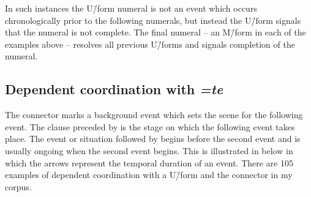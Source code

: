 \begin{exe}
	\label{ex:83}
	\label{ex:130823-5, 0.42}
\end{exe}

In such instances the U\=/form numeral is not an event which
occurs chronologically prior to the following numerals,
but instead the U\=/form signals that the numeral is not complete.
The final numeral -- an M\=/form in each of the examples above --
resolves all previous U\=/forms and signals completion of the numeral.

\subsection{Dependent coordination with \it{=te}}\label{sec:Coo=Te}
The connector  marks a background event
which sets the scene for the following event.
The clause preceded by  is the stage
on which the following event takes place.
The event or situation followed by  begins before the second event
and is usually ongoing when the second event begins.
This is illustrated in  below
in which the arrows represent the temporal duration of an event.
There are 105 examples of dependent coordination with
a U\=/form and the connector  in my corpus.

